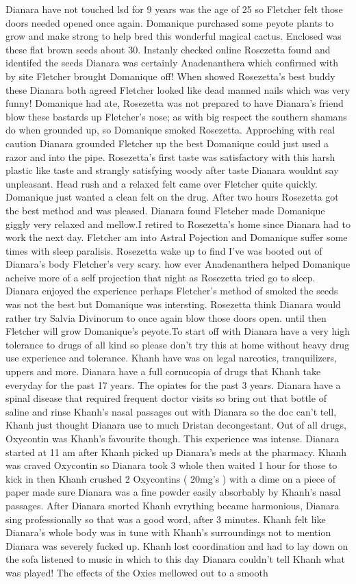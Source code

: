 \documentclass[12pt]{book}
\begin{document}
Dianara have not touched lsd for 9 years was the age of 25 so Fletcher felt those doors needed opened once again. Domanique purchased some peyote plants to grow and make strong to help bred this wonderful magical cactus. Enclosed was these flat brown seeds about 30. Instanly checked online Rosezetta found and identifed the seeds Dianara was certainly Anadenanthera which confirmed with by site Fletcher brought Domanique off! When showed Rosezetta's best buddy these Dianara both agreed Fletcher looked like dead manned nails which was very funny! Domanique had ate, Rosezetta was not prepared to have Dianara's friend blow these bastards up Fletcher's nose; as with big respect the southern shamans do when grounded up, so Domanique smoked Rosezetta. Approching with real caution Dianara grounded Fletcher up the best Domanique could just used a razor and into the pipe. Rosezetta's first taste was satisfactory with this harsh plastic like taste and strangly satisfying woody after taste Dianara wouldnt say unpleasant. Head rush and a relaxed felt came over Fletcher quite quickly. Domanique just wanted a clean felt on the drug. After two hours Rosezetta got the best method and was pleased. Dianara found Fletcher made Domanique giggly very relaxed and mellow.I retired to Rosezetta's home since Dianara had to work the next day. Fletcher am into Astral Pojection and Domanique suffer some times with sleep paralisis. Rosezetta wake up to find I've was booted out of Dianara's body Fletcher's very scary. how ever Anadenanthera helped Domanique acheive more of a self projection that night as Rosezetta tried go to sleep. Dianara enjoyed the experience perhaps Fletcher's method of smoked the seeds was not the best but Domanique was intersting. Rosezetta think Dianara would rather try Salvia Divinorum to once again blow those doors open. until then Fletcher will grow Domanique's peyote.To start off with Dianara have a very high tolerance to drugs of all kind so please don't try this at home without heavy drug use experience and tolerance. Khanh have was on legal narcotics, tranquilizers, uppers and more. Dianara have a full cornucopia of drugs that Khanh take everyday for the past 17 years. The opiates for the past 3 years. Dianara have a spinal disease that required frequent doctor visits so bring out that bottle of saline and rinse Khanh's nasal passages out with Dianara so the doc can't tell, Khanh just thought Dianara use to much Dristan decongestant. Out of all drugs, Oxycontin was Khanh's favourite though. This experience was intense. Dianara started at 11 am after Khanh picked up Dianara's meds at the pharmacy. Khanh was craved Oxycontin so Dianara took 3 whole then waited 1 hour for those to kick in then Khanh crushed 2 Oxycontins ( 20mg's ) with a dime on a piece of paper made sure Dianara was a fine powder easily absorbably by Khanh's nasal passages. After Dianara snorted Khanh evrything became harmonious, Dianara sing professionally so that was a good word, after 3 minutes. Khanh felt like Dianara's whole body was in tune with Khanh's surroundings not to mention Dianara was severely fucked up. Khanh lost coordination and had to lay down on the sofa listened to music in which to this day Dianara couldn't tell Khanh what was played! The effects of the Oxies mellowed out to a smooth 
\end{document}
